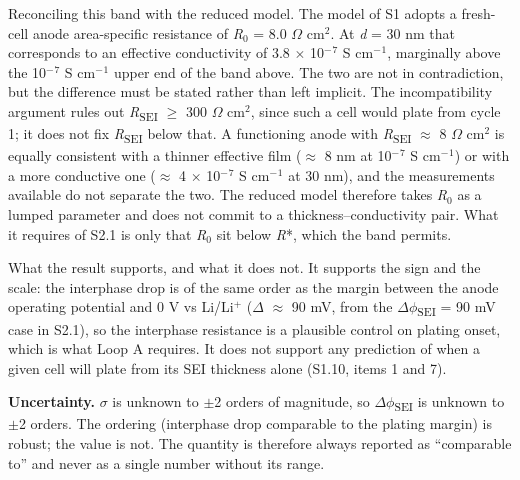 \documentclass[11pt,a4paper]{article}
\begin{document}
Reconciling this band with the reduced model. The model of S1 adopts a fresh-cell anode area-specific resistance of \emph{R}\ensuremath{_{0}} = 8.0 \ensuremath{\Omega} cm\ensuremath{^{2}}. At \emph{d} = 30 nm that corresponds to an effective conductivity of 3.8 \ensuremath{\times} 10\ensuremath{^{-}}\ensuremath{^{7}} S cm\ensuremath{^{-}}\ensuremath{^{1}}, marginally above the 10\ensuremath{^{-}}\ensuremath{^{7}} S cm\ensuremath{^{-}}\ensuremath{^{1}} upper end of the band above. The two are not in contradiction, but the difference must be stated rather than left implicit. The incompatibility argument rules out \emph{R}\textsubscript{SEI} \ensuremath{\geq} 300 \ensuremath{\Omega} cm\ensuremath{^{2}}, since such a cell would plate from cycle 1; it does not fix \emph{R}\textsubscript{SEI} below that. A functioning anode with \emph{R}\textsubscript{SEI} \ensuremath{\approx} 8 \ensuremath{\Omega} cm\ensuremath{^{2}} is equally consistent with a thinner effective film (\ensuremath{\approx} 8 nm at 10\ensuremath{^{-}}\ensuremath{^{7}} S cm\ensuremath{^{-}}\ensuremath{^{1}}) or with a more conductive one (\ensuremath{\approx} 4 \ensuremath{\times} 10\ensuremath{^{-}}\ensuremath{^{7}} S cm\ensuremath{^{-}}\ensuremath{^{1}} at 30 nm), and the measurements available do not separate the two. The reduced model therefore takes \emph{R}\ensuremath{_{0}} as a lumped parameter and does not commit to a thickness--conductivity pair. What it requires of S2.1 is only that \emph{R}\ensuremath{_{0}} sit below \emph{R}*, which the band permits.


What the result supports, and what it does not. It supports the sign and the scale: the interphase drop is of the same order as the margin between the anode operating potential and 0 V vs Li/Li\ensuremath{^{+}} (\ensuremath{\Delta} \ensuremath{\approx} 90 mV, from the \ensuremath{\Delta}\ensuremath{\phi}\textsubscript{SEI} = 90 mV case in S2.1), so the interphase resistance is a plausible control on plating onset, which is what Loop A requires. It does not support any prediction of when a given cell will plate from its SEI thickness alone (S1.10, items 1 and 7).


\textbf{Uncertainty.} \ensuremath{\sigma} is unknown to \ensuremath{\pm}2 orders of magnitude, so \ensuremath{\Delta}\ensuremath{\phi}\textsubscript{SEI} is unknown to \ensuremath{\pm}2 orders. The ordering (interphase drop comparable to the plating margin) is robust; the value is not. The quantity is therefore always reported as \textquotedblleft{}comparable to\textquotedblright{} and never as a single number without its range.
\end{document}
